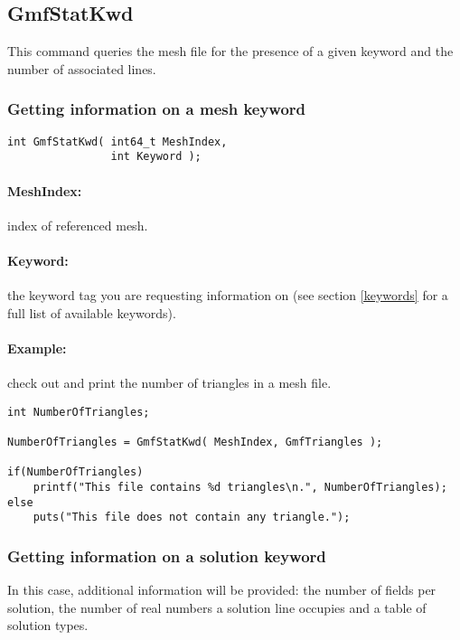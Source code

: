 \documentclass[a4paper,12pt]{article}
\begin{document}
\subsection{GmfStatKwd}
This command queries the mesh file for the presence of a given keyword and the number of associated lines.


\subsubsection{Getting information on a mesh keyword}

\begin{tt}
\begin{verbatim}
int GmfStatKwd( int64_t MeshIndex,
                int Keyword );
\end{verbatim}
\end{tt}
\normalfont

\paragraph{MeshIndex:} index of referenced mesh.

\paragraph{Keyword:} the keyword tag you are requesting information on (see section \ref{keywords} for a full list of available keywords).

\paragraph{Example:} check out and print the number of triangles in a mesh file.

\begin{tt}
\begin{verbatim}
int NumberOfTriangles;

NumberOfTriangles = GmfStatKwd( MeshIndex, GmfTriangles );

if(NumberOfTriangles)
    printf("This file contains %d triangles\n.", NumberOfTriangles);
else
    puts("This file does not contain any triangle.");
\end{verbatim}
\end{tt}
\normalfont

\subsubsection{Getting information on a solution keyword}
In this case, additional information will be provided: the number of fields per solution, the number of real numbers a solution line occupies and a table of solution types.
\end{document}
